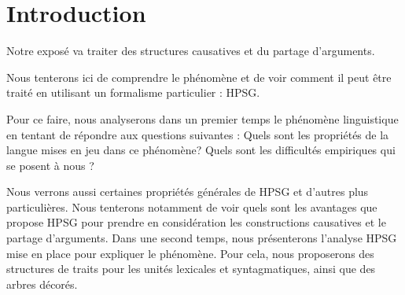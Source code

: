 \section{Introduction}

Notre exposé va traiter des structures causatives et du partage d'arguments.

Nous tenterons ici de comprendre le phénomène et de voir comment il peut être traité en utilisant un formalisme particulier : HPSG.

Pour ce faire, nous analyserons dans un premier temps le phénomène linguistique en tentant de répondre aux questions suivantes :
Quels sont les propriétés de la langue mises en jeu dans ce phénomène?
Quels sont les difficultés empiriques qui se posent à nous ?

Nous verrons aussi certaines propriétés générales de HPSG et d'autres plus particulières.
Nous tenterons notamment de voir quels sont les avantages que propose HPSG pour prendre en considération les constructions causatives et le partage d'arguments.
Dans une second temps, nous présenterons l'analyse HPSG mise en place pour expliquer le phénomène.
Pour cela, nous proposerons des structures de traits pour les unités lexicales et syntagmatiques, ainsi que des arbres décorés.

